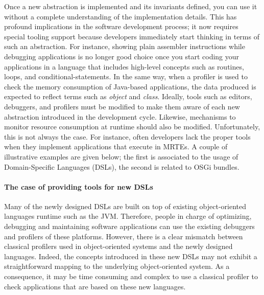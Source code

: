 Once a new abstraction is implemented and its invariants defined, you can use it without a complete understanding of the implementation details.
This has profound implications in the software development process; it now requires special tooling support because developers immediately start thinking in terms of such an abstraction.
For instance, showing plain assembler instructions while debugging applications is no longer good choice once you start coding your applications in a language that includes high-level concepts such as routines, loops, and conditional-statements.
In the same way, when a profiler is used to check the memory consumption of Java-based applications, the data produced is expected to reflect terms such as \textit{object} and \textit{class}.
Ideally, tools such as editors, debuggers, and profilers must be modified to make them aware of each new abstraction introduced in the development cycle.
Likewise, mechanisms to monitor resource consumption at runtime should also be modified.
Unfortunately, this is not always the case.
For instance, often developers lack the proper tools when they implement applications that execute in MRTEs.
A couple of illustrative examples are given below; the first is associated to the usage of Domain-Specific Languages (DSLs), the second is related to OSGi bundles.

\paragraph{The case of providing tools for new DSLs}
Many of the newly designed DSLs are built on top of existing object-oriented languages runtime such as the JVM. 
Therefore, people in charge of optimizing, debugging and maintaining software applications can use the existing debuggers and profilers of these platforms. 
However, there is a clear mismatch between classical profilers used in object-oriented systems and the newly designed languages. 
Indeed, the concepts introduced in these new DSLs may not exhibit a straightforward mapping to the underlying object-oriented system.
As a consequence, it may be time consuming and complex to use a classical profiler to check applications that are based on these new languages.

